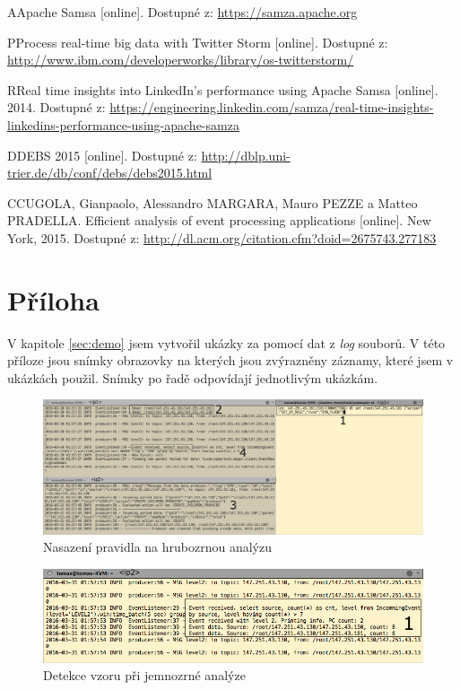 \documentclass[
  digital, %
  table,   %
  nolof,     %
  nolot,     %
  oneside, %
  nocover,
  monochrome,
  12pt
]{fithesis3}
\begin{document}
\begin{thebibliography}{99}
\bibitem
AApache Samsa [online]. Dostupné z: \url{https://samza.apache.org} \label{bib_samsa}

\bibitem
PProcess real-time big data with Twitter Storm [online]. Dostupné z: \url{http://www.ibm.com/developerworks/library/os-twitterstorm/} \label{bib_distributed_computing}

\bibitem
RReal time insights into LinkedIn's performance using Apache Samsa [online]. 2014. Dostupné z: \url{https://engineering.linkedin.com/samza/real-time-insights-linkedins-performance-using-apache-samza} \label{bib_samsa_case_study}

\bibitem
DDEBS 2015 [online]. Dostupné z: \url{http://dblp.uni-trier.de/db/conf/debs/debs2015.html} \label{bib_debs_conf}

\bibitem
CCUGOLA, Gianpaolo, Alessandro MARGARA, Mauro PEZZE a Matteo PRADELLA. Efficient analysis of event processing applications [online]. New York, 2015. Dostupné z: \url{http://dl.acm.org/citation.cfm?doid=2675743.277183} \label{bib_cave}

\end{thebibliography}
\appendix %

\chapter{Příloha}
\label{sec:appendix-a}
V kapitole \ref{sec:demo} jsem vytvořil ukázky za pomocí dat z \textit{log} souborů. V této příloze jsou snímky obrazovky na kterých jsou zvýrazněny záznamy, které jsem v ukázkách použil. Snímky po řadě odpovídají jednotlivým ukázkám.

\begin{figure}[H]
	\centering
    \includegraphics[width=\linewidth, height=.29\textheight]{images/deploy-rule-screen.png}
    \caption{Nasazení pravidla na hrubozrnou analýzu}
    \label{fig:deploy-rule-screen}
\end{figure}

\begin{figure}[H]
	\centering
    \includegraphics[width=.9\linewidth, height=.14\textheight]{images/match-pattern-screen.png}
    \caption{Detekce vzoru při jemnozrné analýze}
    \label{fig:match-pattern-screen}
\end{figure}
\end{document}
